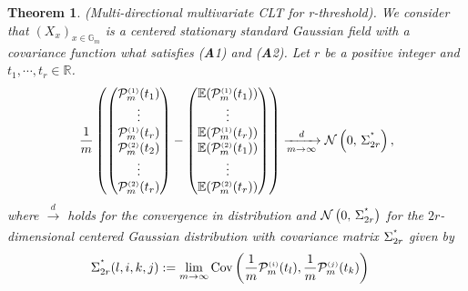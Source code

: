 \documentclass[12pt]{article}
\theoremstyle{Theorem}
\newtheorem{Theorem}{Theorem}[section]
\theoremstyle{definition}
\begin{document}
\begin{Theorem}\label{TCL}(Multi-directional multivariate CLT for r-threshold). We consider that $(X_{x})_{x\in \mathbb{G}_{m}}$ is a centered stationary standard Gaussian field with a covariance function what satisfies (\textbf{A}1) and (\textbf{A}2). Let $r$ be a positive integer and $t_{1}, \cdots,t_{r} \in \mathbb{R}$.  
\begin{equation*}
\frac{1}{m}\left(\begin{pmatrix} \mathcal{P}^{\scriptscriptstyle (1)}_{m}(t_{1}) \\  \vdots \\ \mathcal{P}^{\scriptscriptstyle (1)}_{m}(t_{r}) \\ \mathcal{P}^{\scriptscriptstyle (2)}_{m}(t_{2}) \\  \vdots \\ \mathcal{P}^{\scriptscriptstyle (2)}_{m}(t_{r})  \end{pmatrix} - \begin{pmatrix} \mathbb{E}(\mathcal{P}^{\scriptscriptstyle (1)}_{m}(t_{1}))  \\ \vdots \\ \mathbb{E}(\mathcal{P}^{\scriptscriptstyle (1)}_{m}(t_{r}))\\\mathbb{E}(\mathcal{P}^{\scriptscriptstyle (2)}_{m}(t_{1})) \\ \vdots \\ \mathbb{E}(\mathcal{P}^{\scriptscriptstyle (2)}_{m}(t_{r})) \end{pmatrix}\right) \xrightarrow[m \to \infty]{d} \mathcal{N}\left(0,\,\Sigma_{2r}^{\textcolor{white}{}^{\star}}\right),
\end{equation*}
where $\xrightarrow[]{d}$ holds for the convergence in distribution and $\mathcal{N}\left(0,\,\Sigma_{2r}^{\textcolor{white}{}^{\star}}\right)$ for the $2r$-dimensional centered Gaussian distribution with covariance matrix $\Sigma_{2r}^{\textcolor{white}{}^{\star}}$ given by
\begin{align}
\label{CovTCL}
\Sigma^{\textcolor{white}{}^{\star}}_{2r}(l,i,k,j) & : = \lim_{m \to \infty}\text{Cov}\left(\frac{1}{m}\mathcal{P}^{\scriptscriptstyle (i)}_{m}(t_{l}),  \frac{1}{m}\mathcal{P}^{\scriptscriptstyle (j)}_{m}(t_{k}) \right)
\end{align}
\end{Theorem}
\end{document}
